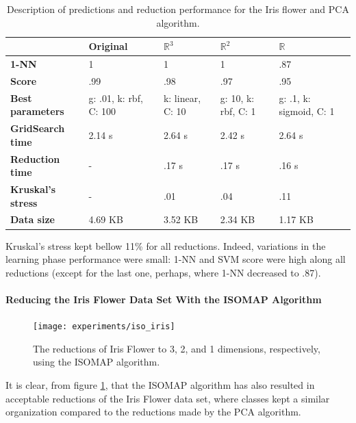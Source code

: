 \begin{table}[H]
	\centering
	
	\begin{tabular}{|p{.25\linewidth}|p{.15\linewidth}|p{.15\linewidth}|p{.15\linewidth}|p{.15\linewidth}|}
		\hline
		& \textbf{Original} & $\mathbb{R}^3$ & $\mathbb{R}^2$ & $\mathbb{R}$ \\\hline
		\textbf{1-NN} & 1 & 1 & 1 & .87 \\\hline
		\textbf{Score} & .99 & .98 & .97 & .95 \\\hline
		\textbf{Best parameters} & g: .01, k: rbf, C: 100 & k: linear, C: 10 & g: 10, k: rbf, C: 1 & g: .1, k: sigmoid, C: 1 \\\hline
		\textbf{GridSearch time} & 2.14 s & 2.64 s & 2.42 s & 2.64 s \\\hline
		\textbf{Reduction time} & - & .17 s & .17 s & .16 s \\\hline
		\textbf{Kruskal's stress} & - & .01 & .04 & .11 \\\hline
		\textbf{Data size} & 4.69 KB & 3.52 KB & 2.34 KB & 1.17 KB \\\hline
	\end{tabular}
	
	\captionsetup{justification=centering}
	\caption{Description of predictions and reduction performance for the Iris flower and PCA algorithm.}
\end{table}

Kruskal's stress kept bellow 11\% for all reductions. Indeed, variations in the learning phase performance were small: 1-NN and SVM score were high along all reductions (except for the last one, perhaps, where 1-NN decreased to .87).

\paragraph{Reducing the Iris Flower Data Set With the ISOMAP Algorithm}

\begin{figure}[H]
	\centering
	\captionsetup{justification=centering}
	\texttt{[image: experiments/iso\_iris]}
	\caption{The reductions of Iris Flower to 3, 2, and 1 dimensions, respectively, using the ISOMAP algorithm.}
	\label{fig:dsirisiso}
\end{figure}

It is clear, from figure \ref{fig:dsirisiso}, that the ISOMAP algorithm has also resulted in acceptable reductions of the Iris Flower data set, where classes kept a similar organization compared to the reductions made by the PCA algorithm.


